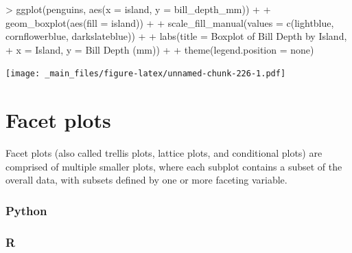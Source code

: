 \documentclass[
]{book}
\newenvironment{Shaded}{\begin{snugshade}}{\end{snugshade}}
\newcommand{\AttributeTok}[1]{\textcolor[rgb]{0.77,0.63,0.00}{#1}}
\newcommand{\FunctionTok}[1]{\textcolor[rgb]{0.00,0.00,0.00}{#1}}
\newcommand{\NormalTok}[1]{#1}
\newcommand{\SpecialCharTok}[1]{\textcolor[rgb]{0.00,0.00,0.00}{#1}}
\newcommand{\StringTok}[1]{\textcolor[rgb]{0.31,0.60,0.02}{#1}}
\begin{document}
\begin{Shaded}
\begin{Highlighting}[]
\SpecialCharTok{\textgreater{}} \FunctionTok{ggplot}\NormalTok{(penguins, }\FunctionTok{aes}\NormalTok{(}\AttributeTok{x =}\NormalTok{ island, }\AttributeTok{y =}\NormalTok{ bill\_depth\_mm)) }\SpecialCharTok{+}
\SpecialCharTok{+}   \FunctionTok{geom\_boxplot}\NormalTok{(}\FunctionTok{aes}\NormalTok{(}\AttributeTok{fill =}\NormalTok{ island)) }\SpecialCharTok{+}
\SpecialCharTok{+}   \FunctionTok{scale\_fill\_manual}\NormalTok{(}\AttributeTok{values =} \FunctionTok{c}\NormalTok{(}\StringTok{\textquotesingle{}lightblue\textquotesingle{}}\NormalTok{, }\StringTok{\textquotesingle{}cornflowerblue\textquotesingle{}}\NormalTok{, }\StringTok{\textquotesingle{}darkslateblue\textquotesingle{}}\NormalTok{)) }\SpecialCharTok{+}
\SpecialCharTok{+}   \FunctionTok{labs}\NormalTok{(}\AttributeTok{title =} \StringTok{\textquotesingle{}Boxplot of Bill Depth by Island\textquotesingle{}}\NormalTok{, }
\SpecialCharTok{+}        \AttributeTok{x =} \StringTok{\textquotesingle{}Island\textquotesingle{}}\NormalTok{, }\AttributeTok{y =} \StringTok{\textquotesingle{}Bill Depth (mm)\textquotesingle{}}\NormalTok{) }\SpecialCharTok{+}
\SpecialCharTok{+}   \FunctionTok{theme}\NormalTok{(}\AttributeTok{legend.position =} \StringTok{\textquotesingle{}none\textquotesingle{}}\NormalTok{)}
\end{Highlighting}
\end{Shaded}

\texttt{[image: \_main\_files/figure-latex/unnamed-chunk-226-1.pdf]}

\hypertarget{facet-plots}{%
\section{Facet plots}\label{facet-plots}}

Facet plots (also called trellis plots, lattice plots, and conditional plots) are comprised of multiple smaller plots, where each subplot contains a subset of the overall data, with subsets defined by one or more faceting variable.

\hypertarget{python-43}{%
\subsubsection*{Python}\label{python-43}}

\hypertarget{r-43}{%
\subsubsection*{R}\label{r-43}}
\end{document}
